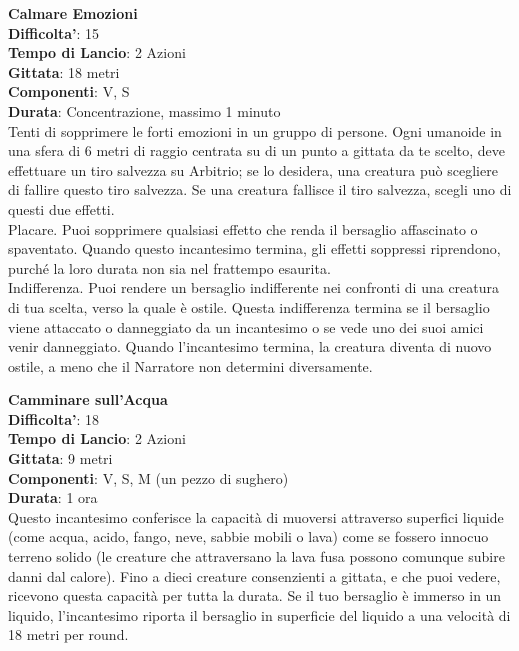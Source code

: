 \begin{multicols}{2}
\medskip\textbf{Calmare Emozioni}\\
\textbf{Difficolta'}: 15\\
\textbf{Tempo di Lancio}: 2 Azioni\\
\textbf{Gittata}: 18 metri\\
\textbf{Componenti}: V, S\\
\textbf{Durata}: Concentrazione, massimo 1 minuto\\
Tenti di sopprimere le forti emozioni in un gruppo di persone. Ogni umanoide in una sfera di 6 metri di raggio centrata su di un punto a gittata da te scelto, deve effettuare un tiro salvezza su Arbitrio; se lo  desidera, una creatura può scegliere di fallire questo tiro salvezza. Se una creatura fallisce il tiro salvezza, scegli uno di questi due effetti. \\
Placare. Puoi sopprimere qualsiasi effetto che renda il bersaglio affascinato o spaventato. Quando questo incantesimo termina, gli effetti soppressi riprendono, purché la loro durata non sia nel frattempo esaurita.\\
Indifferenza. Puoi rendere un bersaglio indifferente nei confronti di una creatura di tua scelta, verso la quale è ostile. Questa indifferenza termina se il bersaglio viene attaccato o danneggiato da un incantesimo o se vede uno dei suoi amici venir danneggiato. Quando l’incantesimo termina, la creatura diventa di nuovo ostile, a meno che il Narratore non determini diversamente.

\medskip\textbf{Camminare sull’Acqua}\\
\textbf{Difficolta'}: 18\\
\textbf{Tempo di Lancio}: 2 Azioni\\
\textbf{Gittata}: 9 metri\\
\textbf{Componenti}: V, S, M (un pezzo di sughero)\\
\textbf{Durata}: 1 ora\\
Questo incantesimo conferisce la capacità di muoversi attraverso superfici liquide (come acqua, acido, fango, neve, sabbie mobili o lava) come se fossero innocuo terreno solido (le creature che attraversano la lava fusa possono comunque subire danni dal calore). Fino a dieci creature consenzienti a gittata, e che puoi vedere, ricevono questa capacità per tutta la durata. Se il tuo bersaglio è immerso in un liquido, l’incantesimo riporta il bersaglio in superficie del liquido a una velocità di 18 metri per round. 


\end{multicols}
